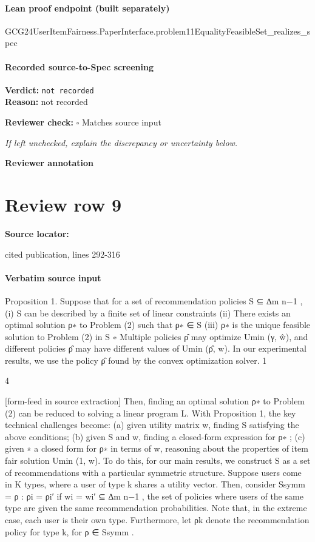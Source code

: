 \documentclass[10pt]{article}
\newcommand{\reviewerbox}{%
  \par\noindent\fbox{\parbox{0.96\linewidth}{\rule{0pt}{0.38in}}}\par
}
\newcommand{\reviewmatch}[1]{%
  \par\noindent\textbf{Reviewer check:} $\square$\; #1\par
  \noindent\emph{If left unchecked, explain the discrepancy or uncertainty below.}\par
}
\begin{document}
\paragraph{Lean proof endpoint (built separately)}\begin{ReviewVerbatim}
GCG24UserItemFairness.PaperInterface.problem11EqualityFeasibleSet_realizes_spec
\end{ReviewVerbatim}

\paragraph{Recorded source-to-Spec screening}
\textbf{Verdict:} \texttt{not recorded}
\\
\textbf{Reason:} not recorded
\reviewmatch{Matches source input}
\noindent\textbf{Reviewer annotation}\par
\reviewerbox
\clearpage
\hypertarget{source-claim-2d18213881f27a07}{}
\section*{Review row 9}
\textbf{Source locator:} {\footnotesize\raggedright cited publication, lines 292-\allowbreak{}316\par}
\paragraph{Verbatim source input}
\begin{ReviewVerbatim}
Proposition 1. Suppose that for a set of recommendation policies S ⊆ ∆m
n−1 ,
(i) S can be described by a finite set of linear constraints
(ii) There exists an optimal solution ρ∗ to Problem (2) such that ρ∗ ∈ S
(iii) ρ∗ is the unique feasible solution to Problem (2) in S
∗
Multiple policies ρ̂ may optimize Umin
(γ, ŵ), and different policies ρ̂ may have different values of
Umin (ρ̂, w). In our experimental results, we use the policy ρ̂ found by the convex optimization solver.
1

4


[form-feed in source extraction]
Then, finding an optimal solution ρ∗ to Problem (2) can be reduced to solving a linear program L.
With Proposition 1, the key technical challenges become: (a) given utility matrix w, finding S
satisfying the above conditions; (b) given S and w, finding a closed-form expression for ρ∗ ; (c) given
∗
a closed form for ρ∗ in terms of w, reasoning about the properties of item fair solution Umin
(1, w).
To do this, for our main results, we construct S as a set of recommendations with a particular
symmetric structure. Suppose users come in K types, where a user of type k shares a utility vector.
Then, consider Ssymm = {ρ : ρi = ρi′ if wi = wi′ } ⊆ ∆m
n−1 , the set of policies where users of the
same type are given the same recommendation probabilities. Note that, in the extreme case, each user
is their own type. Furthermore, let ρk denote the recommendation policy for type k, for ρ ∈ Ssymm .
\end{ReviewVerbatim}
\end{document}
